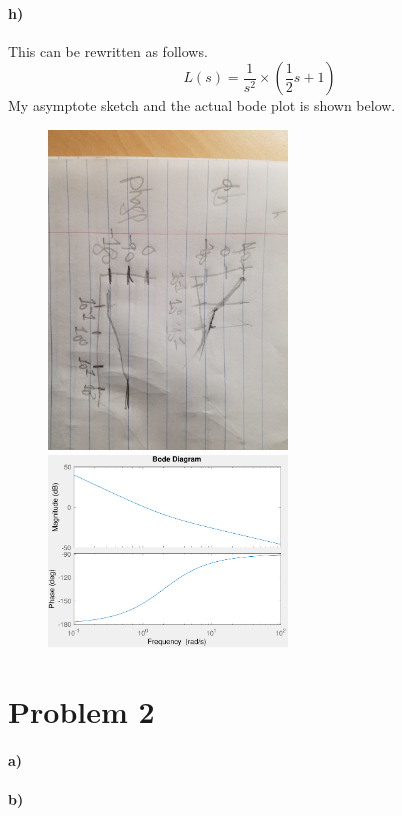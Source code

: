\documentclass[12pt]{article}
\begin{document}
\paragraph{h)}
This can be rewritten as follows.
\[L(s)=\frac{1}{s^2}\times\left(\frac{1}{2}s+1\right)\]
My asymptote sketch and the actual bode plot is shown below.
\begin{figure}[H]
    \begin{center}
        \includegraphics[width=2.5in]{problem1h.jpg}
        \includegraphics[width=2.5in]{problem1h.pdf}
    \end{center}
\end{figure}

\section*{Problem 2}

\paragraph{a)}

\paragraph{b)}
\end{document}
